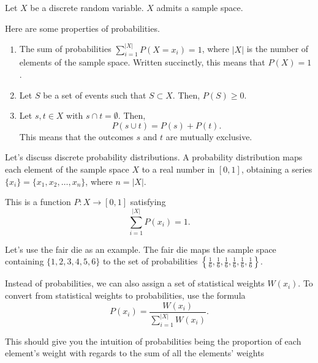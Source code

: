 \documentclass[a4paper, 12pt,oneside,openany]{book}
\begin{document}
Let $X$ be a discrete random variable. $X$ admits a sample space.


Here are some properties of probabilities.

\begin{enumerate}
	\item The sum of probabilities $\sum\limits_{i=1}^{|X|} P(X=x_i) =1$, where $|X|$ is the number of elements of the sample space. Written succinctly, this means that $P(X)=1$.
	\item Let $S$ be a set of events such that $S \subset X$. Then, $P(S) \geq 0$.
	\item Let $s, t \in X$ with $s \cap t = \emptyset$. Then, $$P(s \cup t) = P(s) +P(t).$$ This means that the outcomes $s$ and $t$ are mutually exclusive.
\end{enumerate}



Let's discuss discrete probability distributions. A probability distribution maps each element of the sample space $X$ to a real number in $[0, 1]$, obtaining a series $\{x_i\} = \{x_1, x_2, \dots, x_n \}$, where $n = |X|$.

This is a function $P: X \to [0, 1]$ satisfying $$\sum\limits_{i=1}^{|X|} P(x_i) =1.$$

Let's use the fair die as an example. The fair die maps the sample space containing $\{1, 2, 3, 4, 5, 6 \}$ to the set of probabilities $\left\{\frac{1}{6},\frac{1}{6},\frac{1}{6},\frac{1}{6},\frac{1}{6},\frac{1}{6}\right\}$.

Instead of probabilities, we can also assign a set of statistical weights $W(x_i)$. To convert from statistical weights to probabilities, use the formula $$P(x_i) = \frac{W(x_i)}{\sum\limits_{i=1}^{|X|} W(x_i)}.$$ 

 This should give you the intuition of probabilities being the proportion of each element's weight with regards to the sum of all the elements' weights
\end{document}
